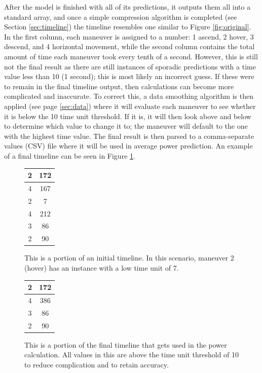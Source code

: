 \documentclass{article}
\begin{document}
After the model is finished with all of its predictions, it outputs them all into a standard array, and once a simple compression algorithm is completed (see Section \ref{sec:timeline}) the timeline resembles one similar to Figure \ref{fig:original}. In the first column, each maneuver is assigned to a number: 1 ascend, 2 hover, 3 descend, and 4 horizontal movement, while the second column contains the total amount of time each maneuver took every tenth of a second. However, this is still not the final result as there are still instances of sporadic predictions with a time value less than 10 (1 second); this is most likely an incorrect guess. If these were to remain in the final timeline output, then calculations can become more complicated and inaccurate. To correct this, a data smoothing algorithm is then applied (see page \ref{sec:data}) where it will evaluate each maneuver to see whether it is below the 10 time unit threshold. If it is, it will then look above and below to determine which value to change it to; the maneuver will default to the one with the highest time value. The final result is then parsed to a comma-separate values (CSV) file where it will be used in average power prediction. An example of a final timeline can be seen in Figure \ref{fig:fixed}.

\begin{figure}[!htb]
\centering
{}
	\centering
	\begin{tabular}{|c|c|}
	\hline
	2&172\\
	\hline
	4&167\\
	\hline
	2&7\\
	\hline
	4&212\\
	\hline
	3&86\\
	\hline
	2&90\\
	\hline
	\end{tabular}
	\caption{This is a portion of an initial timeline. In this scenario, maneuver 2 (hover) has an instance with a low time unit of 7.}
	\label{fig:original}
\endminipage\hfill
{}
	\centering
	\begin{tabular}{|c|c|}
	\hline
	2&172\\
	\hline
	4&386\\
	\hline
	3&86\\
	\hline
	2&90\\
	\hline
	\end{tabular}
	\caption{This is a portion of the final timeline that gets used in the power calculation. All values in this are above the time unit threshold of 10 to reduce complication and to retain accuracy.}
	\label{fig:fixed}
\endminipage\hfill
\end{figure}
\end{document}
